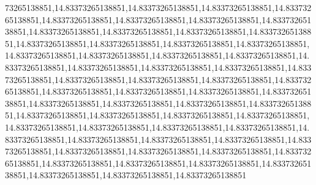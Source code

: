 73265138851,14.83373265138851,14.83373265138851,14.83373265138851,14.83373265138851,14.83373265138851,14.83373265138851,14.83373265138851,14.83373265138851,14.83373265138851,14.83373265138851,14.83373265138851,14.83373265138851,14.83373265138851,14.83373265138851,14.83373265138851,14.83373265138851,14.83373265138851,14.83373265138851,14.83373265138851,14.83373265138851,14.83373265138851,14.83373265138851,14.83373265138851,14.83373265138851,14.83373265138851,14.83373265138851,14.83373265138851,14.83373265138851,14.83373265138851,14.83373265138851,14.83373265138851,14.83373265138851,14.83373265138851,14.83373265138851,14.83373265138851,14.83373265138851,14.83373265138851,14.83373265138851,14.83373265138851,14.83373265138851,14.83373265138851,14.83373265138851,14.83373265138851,14.83373265138851,14.83373265138851,14.83373265138851,14.83373265138851,14.83373265138851,14.83373265138851,14.83373265138851,14.83373265138851,14.83373265138851,14.83373265138851,14.83373265138851,14.83373265138851,14.83373265138851,14.83373265138851,14.83373265138851,14.83373265138851,14.83373265138851,14.83373265138851
